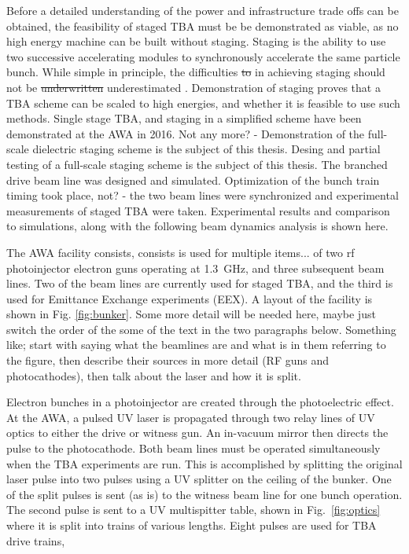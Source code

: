 \documentclass{iitthesis}
\newcommand{\lsnote}[1]{\textsf{{\color{violet}{ LS note:}   #1 }}}
\newcommand{\nrnote}[1]{\textsf{{\color{blue}{ NN note:}   #1 }}}
\begin{document}
Before a detailed understanding of the power and infrastructure trade offs 
can be obtained, the feasibility of staged TBA must be be demonstrated as viable, 
as no high energy machine can be built without staging.
Staging is the ability to use two successive accelerating modules to synchronously accelerate 
the same particle bunch. While simple in principle, the difficulties 
\lsnote{\sout{to} in achieving} staging should not be \lsnote{\sout{underwritten} underestimated}. Demonstration of staging proves that a TBA scheme can be scaled to high energies, and whether it is 
feasible to use such methods. Single stage TBA, and staging 
in a simplified scheme have been demonstrated at the AWA in 2016.
\nrnote{Not any more? - Demonstration of the full-scale dielectric staging scheme is the 
	subject of this thesis.} 
Desing and partial testing of a full-scale staging scheme is the 
subject of this thesis. The branched drive beam line was designed and 
simulated. 
Optimization of the bunch train timing took place, \nrnote{not? - the two 
	beam lines were synchronized and experimental measurements 
	of staged TBA were taken. }
Experimental results and comparison to simulations, along 
with the following beam dynamics analysis is shown here.

 \label{sec:facility}
The AWA facility \lsnote{consists, consists is used for multiple items...} of two rf photoinjector electron guns operating
at \SI{1.3}{GHz}, and three subsequent beam lines. 
Two of the beam lines are currently used for staged TBA, and the
third is used for Emittance Exchange experiments (EEX). A layout of
the facility is shown in Fig. \ref{fig:bunker}. 
\lsnote{Some more detail will be needed here, maybe just switch the order of the some of the text in the two paragraphs below.  Something like; start with saying what the beamlines are and what is in them referring to the figure, then describe their sources in more detail (RF guns and photocathodes), then talk about the laser and how it is split.}

Electron bunches in a photoinjector are created through the photoelectric effect. 
At the AWA, a pulsed UV laser is propagated through two relay lines of UV optics to either
the drive or witness gun. An in-vacuum mirror then directs the pulse to the photocathode.
Both beam lines must be operated simultaneously when the TBA experiments are run. This is accomplished by
splitting the original laser pulse into two pulses using a UV splitter on the 
ceiling of the bunker. One of the split pulses is sent (as is) to the witness beam line for one
bunch operation. The second pulse is sent to a UV multispitter table, shown in 
Fig.~\ref{fig:optics} where it is split into trains of various lengths. Eight pulses are 
used for TBA drive trains, 
\end{document}
